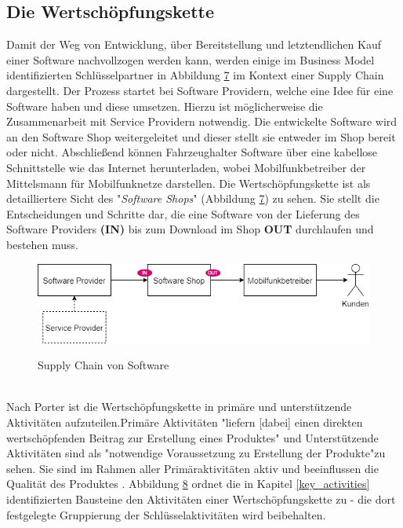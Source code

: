 \subsection{Die Wertschöpfungskette}\label{wsk}
Damit der Weg von Entwicklung, über Bereitstellung und letztendlichen Kauf einer Software nachvollzogen werden kann, werden einige im Business Model identifizierten Schlüsselpartner in Abbildung \hyperref[img:supplychain]{7} im Kontext einer Supply Chain dargestellt. Der Prozess startet bei Software Providern, welche eine Idee für eine Software haben und diese umsetzen. Hierzu ist möglicherweise die Zusammenarbeit mit Service Providern notwendig. Die entwickelte Software wird an den Software Shop weitergeleitet und dieser stellt sie entweder im Shop bereit oder nicht. Abschließend können Fahrzeughalter Software über eine kabellose Schnittstelle wie das Internet herunterladen, wobei Mobilfunkbetreiber der Mittelsmann für Mobilfunknetze darstellen. Die Wertschöpfungskette ist als detailliertere Sicht des "\textit{Software Shops}" (Abbildung \hyperref[img:supplychain]{7}) zu sehen. Sie stellt die Entscheidungen und Schritte dar, die eine Software von der Lieferung des Software Providers \textbf{(IN)} bis zum Download im Shop \textbf{OUT} durchlaufen und bestehen muss.
\begin{figure}[!h]
	\centering
	\includegraphics[width=0.9\columnwidth]{pictures/konzept-supplychain.png}
	\label{img:supplychain}
	\caption{Supply Chain von Software}
\end{figure}\\
Nach Porter ist die Wertschöpfungskette in primäre und unterstützende Aktivitäten aufzuteilen.\cite{wsk}Primäre Aktivitäten "liefern [dabei] einen direkten wertschöpfenden Beitrag zur Erstellung eines Produktes"\cite[]{wsk} und Unterstützende Aktivitäten sind als "notwendige Voraussetzung zu Erstellung der Produkte"\cite[]{wsk}zu sehen. Sie sind im Rahmen aller Primäraktivitäten aktiv und beeinflussen die Qualität des Produktes \cite[Vgl.]{wsk2}. Abbildung \hyperref[img:wsk]{8} ordnet die in Kapitel \ref{key_activities} identifizierten Bausteine den Aktivitäten einer Wertschöpfungskette zu - die dort festgelegte Gruppierung der Schlüsselaktivitäten wird beibehalten.

